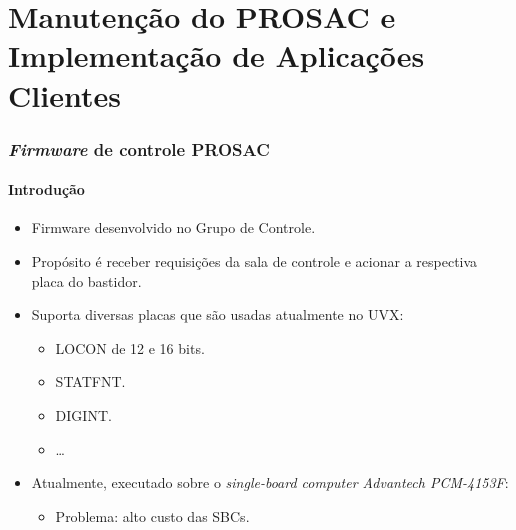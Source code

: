 
\section {Manutenção do PROSAC e Implementação de Aplicações Clientes}

\begin{frame}
\frametitle {\textit{Firmware} de controle PROSAC}
\framesubtitle{Introdução}

\begin{itemize}
  \item Firmware desenvolvido no Grupo de Controle.
  \item Propósito é receber requisições da sala de controle e acionar a
  respectiva placa do bastidor.
  \item Suporta diversas placas que são usadas atualmente no UVX:
  \begin{itemize}
    \item LOCON de 12 e 16 bits.
    \item STATFNT.
    \item DIGINT.
    \item \ldots
   \end{itemize}
   \item Atualmente, executado sobre o \textit{single-board computer Advantech
   PCM-4153F}:
   \begin{itemize} 
   		\item Problema: alto custo das SBCs.
   \end{itemize} 
\end{itemize}

\end{frame}


